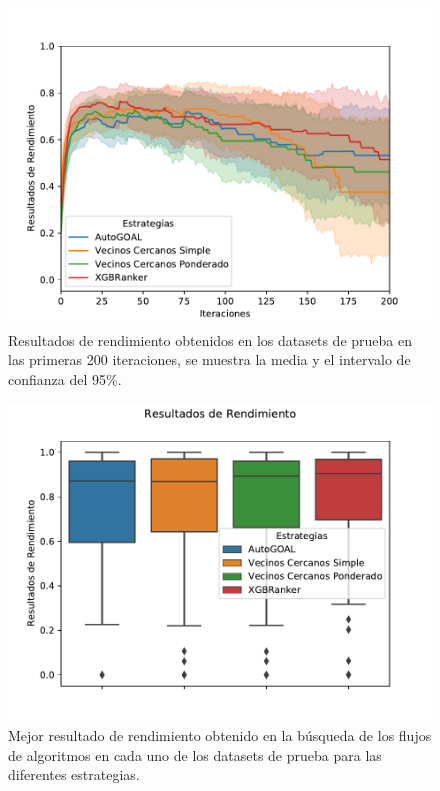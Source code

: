 \documentclass[a4paper,12pt]{article}
\begin{document}
\begin{figure}[htb]
	\centering
	\includegraphics[scale=.8]{Figures/performance.pdf}
	\caption{Resultados de rendimiento obtenidos en los datasets de prueba en las primeras 200 iteraciones, se muestra la media y el intervalo de confianza del 95\%.}
	\label{fig:performance}
\end{figure}

\begin{figure}[htb]
	\centering
	\includegraphics[scale=.8]{Figures/best-fn.pdf}
	\caption{Mejor resultado de rendimiento obtenido en la búsqueda de los flujos de algoritmos en cada uno de los datasets de prueba para las diferentes estrategias.}
	\label{fig:bestfn}
\end{figure}
\end{document}
